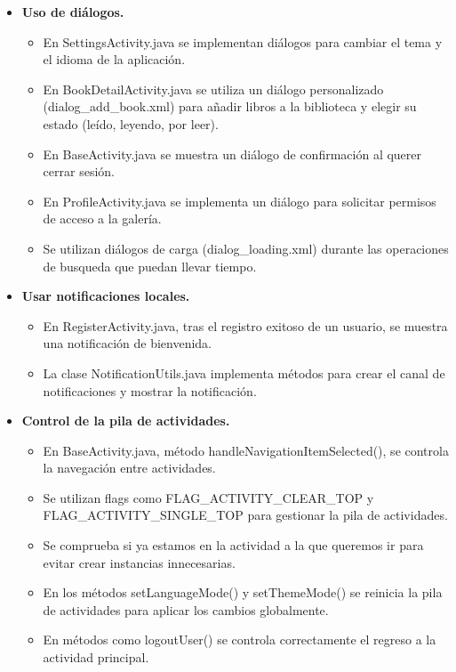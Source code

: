 \documentclass[a4paper,12pt]{report}
\begin{document}
\begin{itemize}
        \item \textbf{Uso de diálogos.}
        \begin{itemize}
          \item En SettingsActivity.java se implementan diálogos para cambiar el tema y el idioma de la aplicación.
          \item En BookDetailActivity.java se utiliza un diálogo personalizado (dialog\_add\_book.xml) para añadir libros a la biblioteca y elegir su estado (leído, leyendo, por leer).
          \item En BaseActivity.java se muestra un diálogo de confirmación al querer cerrar sesión.
          \item En ProfileActivity.java se implementa un diálogo para solicitar permisos de acceso a la galería.
          \item Se utilizan diálogos de carga (dialog\_loading.xml) durante las operaciones de busqueda que puedan llevar tiempo.
        \end{itemize}
        \item \textbf{Usar notificaciones locales.}
        \begin{itemize}
          \item En RegisterActivity.java, tras el registro exitoso de un usuario, se muestra una notificación de bienvenida.
          \item La clase NotificationUtils.java implementa métodos para crear el canal de notificaciones y mostrar la notificación.
        \end{itemize}
        \item \textbf{Control de la pila de actividades.}
        \begin{itemize}
          \item En BaseActivity.java, método handleNavigationItemSelected(), se controla la navegación entre actividades.
          \item Se utilizan flags como FLAG\_ACTIVITY\_CLEAR\_TOP y FLAG\_ACTIVITY\_SINGLE\_TOP para gestionar la pila de actividades.
          \item Se comprueba si ya estamos en la actividad a la que queremos ir para evitar crear instancias innecesarias.
          \item En los métodos setLanguageMode() y setThemeMode() se reinicia la pila de actividades para aplicar los cambios globalmente.
          \item En métodos como logoutUser() se controla correctamente el regreso a la actividad principal.
          \end{itemize}
      \end{itemize}
\end{document}
